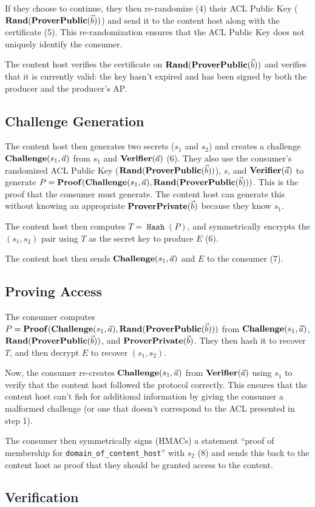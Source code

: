 \documentclass[pdftex,12pt,a4papaer,twoside,notitlepage]{report}
\DeclareMathOperator{\hash}{\mathtt{Hash}}
\DeclareMathOperator{\Proof}{\mathbf{Proof}}
\DeclareMathOperator{\rand}{\mathbf{Rand}}
\begin{document}
If they choose to continue, they then re-randomize (4) their ACL Public Key
\allowbreak($\rand(\Pv)$) and send it to the content host along with the certificate (5).
This re-randomization ensures that the ACL Public Key does not uniquely identify
the consumer.

The content host verifies the certificate on $\rand(\Pv)$ and verifies
that it is currently valid: the key hasn't expired and has been signed by
both the producer and the producer's AP.

\subsection{Challenge Generation}

The content host then generates two secrets ($s_1$ and $s_2$) and creates a
challenge $\operatorname{\mathbf{Challenge}}(s_1, \vec{a})$ from $s_1$ and $\operatorname{\mathbf{Verifier}}(\vec{a})$ (6). They also use the consumer's
randomized ACL Public Key ($\rand(\Pv)$), $s$, and $\operatorname{\mathbf{Verifier}}(\vec{a})$ to generate $P =
\Proof(\Cv, \allowbreak\rand(\Pv))$. This is the proof that the consumer must
generate. The content host can generate this without knowing an appropriate
$\operatorname{\mathbf{ProverPrivate}}(\vec{b})$ because they know $s_1$.

The content host then computes $T = \hash(P)$, and symmetrically encrypts the
$(s_1, s_2)$ pair using $T$ as the secret key to produce $E$ (6).

The content host then sends $\operatorname{\mathbf{Challenge}}(s_1, \vec{a})$ and $E$ to the consumer (7).

\subsection{Proving Access}

The consumer computes $P = \Proof(\Cv, \rand(\Pv))$ from $\operatorname{\mathbf{Challenge}}(s_1, \vec{a})$, $\rand(\Pv)$,
and $\operatorname{\mathbf{ProverPrivate}}(\vec{b})$. They then hash it to recover $T$, and then decrypt $E$ to recover
$(s_1, s_2)$.

Now, the consumer re-creates $\operatorname{\mathbf{Challenge}}(s_1, \vec{a})$ from $\operatorname{\mathbf{Verifier}}(\vec{a})$ using $s_1$ to verify that the
content host followed the protocol correctly. This ensures that the content host
can't fish for additional information by giving the consumer a malformed
challenge (or one that doesn't correspond to the ACL presented in step 1).

The consumer then symmetrically signs (HMACs) a statement ``proof of membership
for \texttt{domain\_of\_content\_host}'' with $s_2$ (8) and sends this back to
the content host as proof that they should be granted access to the content.

\subsection{Verification}
\end{document}
